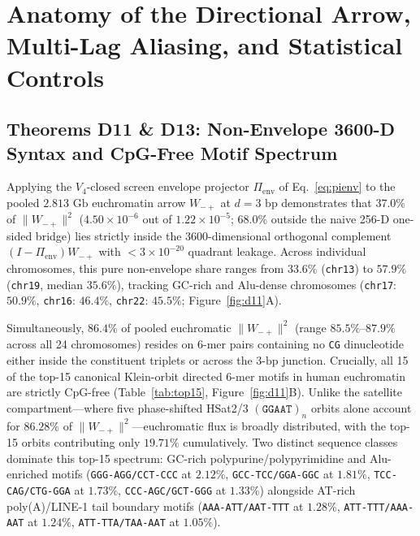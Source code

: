\documentclass[11pt,a4paper]{article}
\newcommand{\Wmp}{W_{-+}}
\newcommand{\Pienv}{\Pi_{\mathrm{env}}}
\begin{document}
\section{Anatomy of the Directional Arrow, Multi-Lag Aliasing, and Statistical Controls}
\label{sec:results_b}

\subsection{Theorems D11 \& D13: Non-Envelope 3600-D Syntax and CpG-Free Motif Spectrum}
Applying the $V_4$-closed screen envelope projector $\Pienv$ of Eq.~\eqref{eq:pienv} to the pooled $2.813\text{ Gb}$ euchromatin arrow $\Wmp$ at $d=3\text{ bp}$ demonstrates that $37.0\%$ of $\|\Wmp\|^2$ ($4.50\times 10^{-6}$ out of $1.22\times 10^{-5}$; $68.0\%$ outside the naive 256-D one-sided bridge) lies strictly inside the $3600$-dimensional orthogonal complement $(I-\Pienv)\Wmp$ with $<3\times 10^{-20}$ quadrant leakage. Across individual chromosomes, this pure non-envelope share ranges from $33.6\%$ (\texttt{chr13}) to $57.9\%$ (\texttt{chr19}, median $35.6\%$), tracking GC-rich and Alu-dense chromosomes (\texttt{chr17}: $50.9\%$, \texttt{chr16}: $46.4\%$, \texttt{chr22}: $45.5\%$; Figure~\ref{fig:d11}A).

Simultaneously, $86.4\%$ of pooled euchromatic $\|\Wmp\|^2$ (range $85.5\%$--$87.9\%$ across all 24 chromosomes) resides on 6-mer pairs containing no \texttt{CG} dinucleotide either inside the constituent triplets or across the $3\text{-bp}$ junction. Crucially, all 15 of the top-15 canonical Klein-orbit directed 6-mer motifs in human euchromatin are strictly CpG-free (Table~\ref{tab:top15}, Figure~\ref{fig:d11}B). Unlike the satellite compartment---where five phase-shifted HSat2/3 $(\texttt{GGAAT})_n$ orbits alone account for $86.28\%$ of $\|\Wmp\|^2$---euchromatic flux is broadly distributed, with the top-15 orbits contributing only $19.71\%$ cumulatively. Two distinct sequence classes dominate this top-15 spectrum: GC-rich polypurine/polypyrimidine and Alu-enriched motifs (\texttt{GGG-AGG/CCT-CCC} at $2.12\%$, \texttt{GCC-TCC/GGA-GGC} at $1.81\%$, \texttt{TCC-CAG/CTG-GGA} at $1.73\%$, \texttt{CCC-AGC/GCT-GGG} at $1.33\%$) alongside AT-rich poly(A)/LINE-1 tail boundary motifs (\texttt{AAA-ATT/AAT-TTT} at $1.28\%$, \texttt{ATT-TTT/AAA-AAT} at $1.24\%$, \texttt{ATT-TTA/TAA-AAT} at $1.05\%$).
\end{document}
